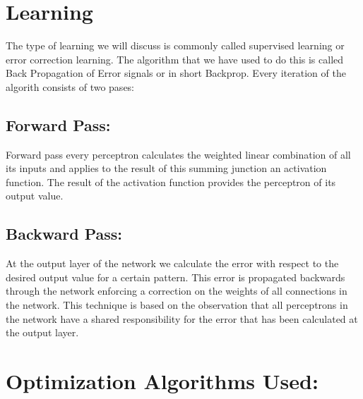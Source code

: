 \documentclass{report}
\begin{document}


\section{Learning}
The type of learning we will discuss is commonly called supervised learning or error correction learning. The algorithm that we have used to do this is called Back Propagation of Error signals or in short Backprop. Every iteration of the algorith consists of two pases: 

\subsection{Forward Pass: }
Forward pass every perceptron calculates the weighted linear combination of all its inputs and applies to the result of this summing junction an activation function. The result of the activation function provides the perceptron of its output value.

\subsection{Backward Pass: }
 At the output layer of the network we calculate the error with respect to the desired output value for a certain pattern. This error is propagated backwards through the network enforcing a correction on the weights of all connections in the network. This technique is based on the observation that all perceptrons in the network have a shared  responsibility for the error that has been calculated at the output layer.

\section{Optimization Algorithms Used:}
\end{document}
